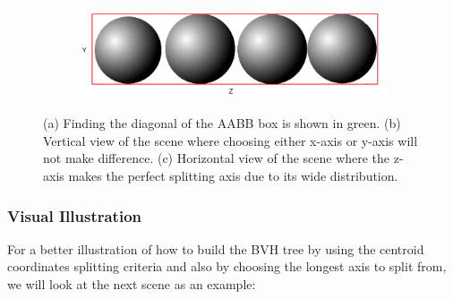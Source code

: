 \documentclass[11pt,a4paper]{article}
\begin{document}
\begin{figure}[H]
     \hfill
     \begin{subfigure}[t]{0.3\textwidth}
         \centering
         \includegraphics[width=\textwidth]{images/LONGAXIS_Z.png}
         \caption{}
         \label{fig:pi_18000}
     \end{subfigure}
        \captionsetup{justification=centering,margin=2cm}
        \caption{(a) Finding the diagonal of the AABB box is shown in green. (b) Vertical view of the scene where choosing either x-axis or y-axis will not make difference. (c) Horizontal view of the scene where the z-axis makes the perfect splitting axis due to its wide distribution.}
        \label{fig:aabbexample}
\end{figure}

\subsubsection{Visual Illustration}
For a better illustration of how to build the BVH tree by using the centroid coordinates splitting criteria and also by choosing the longest axis to split from, we will look at the next scene as an example: 
\end{document}
